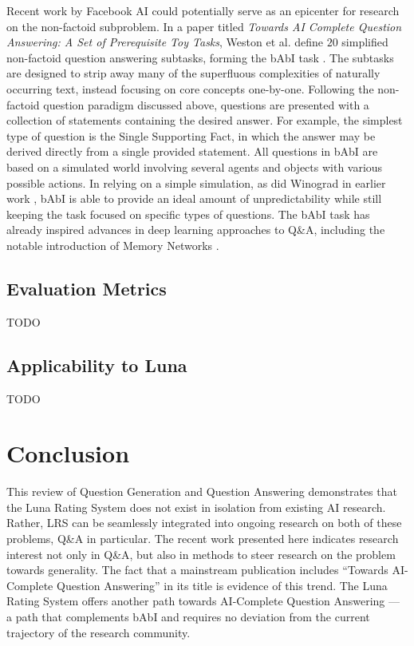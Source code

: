 Recent work by Facebook AI could potentially serve as an epicenter for research on the non-factoid subproblem. In a paper titled \textit{Towards AI Complete Question Answering: A Set of Prerequisite Toy Tasks}, Weston et al. define $20$ simplified non-factoid question answering subtasks, forming the bAbI task \citep{weston2015towards}. The subtasks are designed to strip away many of the superfluous complexities of naturally occurring text, instead focusing on core concepts one-by-one. Following the non-factoid question paradigm discussed above, questions are presented with a collection of statements containing the desired answer. For example, the simplest type of question is the Single Supporting Fact, in which the answer may be derived directly from a single provided statement. All questions in bAbI are based on a simulated world involving several agents and objects with various possible actions. In relying on a simple simulation, as did Winograd in earlier work \citep{winograd1971procedures}, bAbI is able to provide an ideal amount of unpredictability while still keeping the task focused on specific types of questions. The bAbI task has already inspired advances in deep learning approaches to Q\&A, including the notable introduction of Memory Networks \citep{sukhbaatar2015weakly}.

\subsection{Evaluation Metrics}

TODO

\subsection{Applicability to Luna}

TODO



\section{Conclusion}

This review of Question Generation and Question Answering demonstrates that the Luna Rating System does not exist in isolation from existing AI research. Rather, LRS can be seamlessly integrated into ongoing research on both of these problems, Q\&A in particular. The recent work presented here indicates research interest not only in Q\&A, but also in methods to steer research on the problem towards generality. The fact that a mainstream publication includes ``Towards AI-Complete Question Answering'' in its title is evidence of this trend. The Luna Rating System offers another path towards AI-Complete Question Answering --- a path that complements bAbI and requires no deviation from the current trajectory of the research community.


